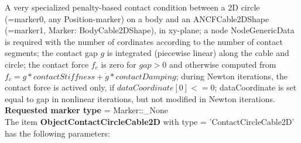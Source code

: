 A very specialized penalty-based contact condition between a 2D circle (=marker0, any Position-marker) on a body and an ANCFCable2DShape (=marker1, Marker: BodyCable2DShape), in xy-plane; a node NodeGenericData is required with the number of cordinates according to the number of contact segments; the contact gap $g$ is integrated (piecewise linear) along the cable and circle; the contact force $f_c$ is zero for $gap>0$ and otherwise computed from $f_c = g*contactStiffness + \dot g*contactDamping$; during Newton iterations, the contact force is actived only, if $dataCoordinate[0] <= 0$; dataCoordinate is set equal to gap in nonlinear iterations, but not modified in Newton iterations.
 \\  {\bf Requested marker type} = Marker::\_None \\ 
\vspace{12pt} \noindent The item {\bf ObjectContactCircleCable2D} with type = 'ContactCircleCable2D' has the following parameters:\vspace{-1cm}\\ 
